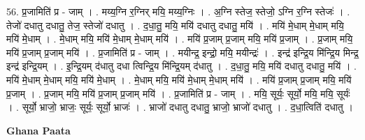 \documentclass[17pt]{extarticle}
\begin{document}
56. प्र॒जामिति॑ प्र - जाम् । . मय्य॒ग्नि र॒ग्निर् मयि॒ मय्य॒ग्निः । . अ॒ग्नि स्तेज॒ स्तेजो॒ ऽग्नि र॒ग्नि स्तेजः॑ । . तेजो॑ दधातु दधातु॒ तेज॒ स्तेजो॑ दधातु । . द॒धा॒तु॒ मयि॒ मयि॑ दधातु दधातु॒ मयि॑ । . मयि॑ मे॒धाम् मे॒धाम् मयि॒ मयि॑ मे॒धाम् । . मे॒धाम् मयि॒ मयि॑ मे॒धाम् मे॒धाम् मयि॑ । . मयि॑ प्र॒जाम् प्र॒जाम् मयि॒ मयि॑ प्र॒जाम् । . प्र॒जाम् मयि॒ मयि॑ प्र॒जाम् प्र॒जाम् मयि॑ । . प्र॒जामिति॑ प्र - जाम् । . मयीन्द्र॒ इन्द्रो॒ मयि॒ मयीन्द्रः॑ । . इन्द्र॑ इन्द्रि॒य मि॑न्द्रि॒य मिन्द्र॒ इन्द्र॑ इन्द्रि॒यम् । . इ॒न्द्रि॒यम् द॑धातु दधा त्विन्द्रि॒य मि॑न्द्रि॒यम् द॑धातु । . द॒धा॒तु॒ मयि॒ मयि॑ दधातु दधातु॒ मयि॑ । . मयि॑ मे॒धाम् मे॒धाम् मयि॒ मयि॑ मे॒धाम् । . मे॒धाम् मयि॒ मयि॑ मे॒धाम् मे॒धाम् मयि॑ । . मयि॑ प्र॒जाम् प्र॒जाम् मयि॒ मयि॑ प्र॒जाम् । . प्र॒जाम् मयि॒ मयि॑ प्र॒जाम् प्र॒जाम् मयि॑ । . प्र॒जामिति॑ प्र - जाम् । . मयि॒ सूर्यः॒ सूर्यो॒ मयि॒ मयि॒ सूर्यः॑ । . सूर्यो॒ भ्राजो॒ भ्राजः॒ सूर्यः॒ सूर्यो॒ भ्राजः॑ । . भ्राजो॑ दधातु दधातु॒ भ्राजो॒ भ्राजो॑ दधातु । . द॒धा॒त्विति॑ दधातु । \newline

\textbf{Ghana Paata } \newline
\end{document}
